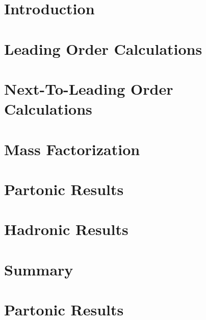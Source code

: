 \documentclass[
  english,		%
  a4paper,		%
  11pt,			%
  DIV=12,
  titlepage,
  toc=bibnumbered,
  parskip=full,  	%
  headings=normal,
  BCOR=12mm,
  numbers=noenddot
]{scrartcl}
\begin{document}
\section{Introduction}


\section{Leading Order Calculations}


\section{Next-To-Leading Order Calculations}


\section{Mass Factorization}


\section{Partonic Results}


\section{Hadronic Results}


\section{Summary}


\appendix

\section{Partonic Results}



\listoffixmes
\end{document}
